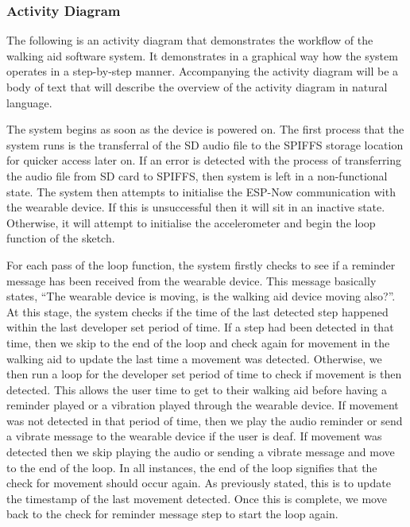                 \newpage

            \subsubsection{Activity Diagram}
            \label{subsubsec:walking_aid_activity}

                The following is an activity diagram that demonstrates the workflow of the walking aid software system. It demonstrates in a graphical way how the system operates in a step-by-step manner. Accompanying the activity diagram will be a body of text that will describe the overview of the activity diagram in natural language.

                
            
                The system begins as soon as the device is powered on. The first process that the system runs is the transferral of the SD audio file to the SPIFFS storage location for quicker access later on. If an error is detected with the process of transferring the audio file from SD card to SPIFFS, then system is left in a non-functional state. The system then attempts to initialise the ESP-Now communication with the wearable device. If this is unsuccessful then it will sit in an inactive state. Otherwise, it will attempt to initialise the accelerometer and begin the loop function of the sketch. 

                For each pass of the loop function, the system firstly checks to see if a reminder message has been received from the wearable device. This message basically states, ``The wearable device is moving, is the walking aid device moving also?''. At this stage, the system checks if the time of the last detected step happened within the last developer set period of time. If a step had been detected in that time, then we skip to the end of the loop and check again for movement in the walking aid to update the last time a movement was detected. Otherwise, we then run a loop for the developer set period of time to check if movement is then detected. This allows the user time to get to their walking aid before having a reminder played or a vibration played through the wearable device. If movement was not detected in that period of time, then we play the audio reminder or send a vibrate message to the wearable device if the user is deaf. If movement was detected then we skip playing the audio or sending a vibrate message and move to the end of the loop. In all instances, the end of the loop signifies that the check for movement should occur again. As previously stated, this is to update the timestamp of the last movement detected. Once this is complete, we move back to the check for reminder message step to start the loop again.

